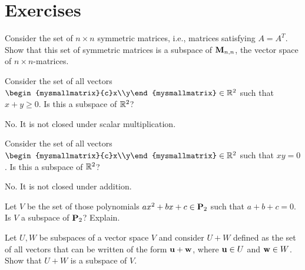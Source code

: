\section*{Exercises}

\begin{ex}
  Consider the set of $n\times n$ symmetric matrices, i.e., matrices
  satisfying $A=A^{T}$. Show that this set of symmetric matrices is a
  subspace of $\mathbf{M}_{n,n}$, the vector space of $n\times n$-matrices.
\end{ex}

\begin{ex}
  Consider the set of all vectors
  $\begin{mysmallmatrix}{c}x\\y\end{mysmallmatrix}\in\R^2$ such that
  $x+y\geq 0$. Is this a subspace of $\mathbb{R}^{2}$?
  \begin{sol}
    No. It is not closed under scalar multiplication.
  \end{sol}
\end{ex}

\begin{ex}
  Consider the set of all vectors
  $\begin{mysmallmatrix}{c}x\\y\end{mysmallmatrix}\in\R^2$ such that $xy=0$. Is
  this a subspace of $\mathbb{R}^{2}$?
  \begin{sol}
    No. It is not closed under addition.
  \end{sol}
\end{ex}

\begin{ex}
  Let $V$ be the set of those polynomials $ax^2+bx+c\in\mathbf{P}_{2}$ such
  that $a+b+c=0$. Is $V$ a subspace of $\mathbf{P}_{2}$? Explain.
\end{ex}

\begin{ex}
  Let $U,W$ be subspaces of a vector space $V$ and consider $U+W$
  defined as the set of all vectors that can be written of the form
  $\mbox{\bf u}+\mbox{\bf w}$, where $\mbox{\bf u}\in U$ and $\mbox{\bf w}\in W$. Show
  that $U+W$ is a subspace of $V$.
\end{ex}


